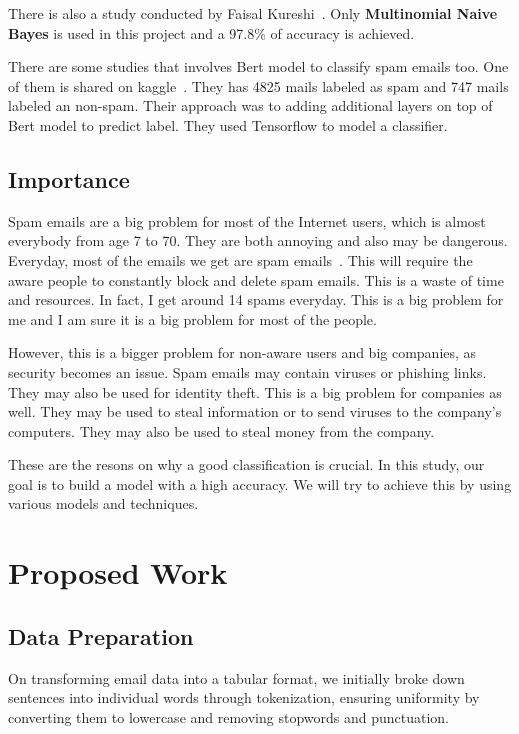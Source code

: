 \documentclass[conference]{IEEEtran}
\begin{document}
There is also a study conducted by Faisal Kureshi \cite{faisal_kureshi}. Only \textbf{Multinomial Naive Bayes} is used in this project and a 97.8\% of accuracy is achieved.

There are some studies that involves Bert model to classify spam emails too. One of them is shared on kaggle \cite{bert_research}. They has 4825 mails labeled as spam and 747 mails labeled an non-spam. Their approach was to adding additional layers on top of Bert model to predict label. They used Tensorflow to model a classifier.
\subsection{Importance}

Spam emails are a big problem for most of the Internet users, which is almost everybody from age 7 to 70. They are both annoying and also may be dangerous. Everyday, most of the emails we get are spam emails \cite{dataprot_spam}. This will require the aware people to constantly block and delete spam emails. This is a waste of time and resources. In fact, I get around 14 spams everyday. This is a big problem for me and I am sure it is a big problem for most of the people.

However, this is a bigger problem for non-aware users and big companies, as security becomes an issue. Spam emails may contain viruses or phishing links. They may also be used for identity theft. This is a big problem for companies as well. They may be used to steal information or to send viruses to the company's computers. They may also be used to steal money from the company.

These are the resons on why a good classification is crucial. In this study, our goal is to build a model with a high accuracy. We will try to achieve this by using various models and techniques.

\section{Proposed Work}

\subsection{Data Preparation}
On transforming email data into a tabular format, we initially broke down sentences into individual words through tokenization, ensuring uniformity by converting them to lowercase and removing stopwords and punctuation.
\end{document}
